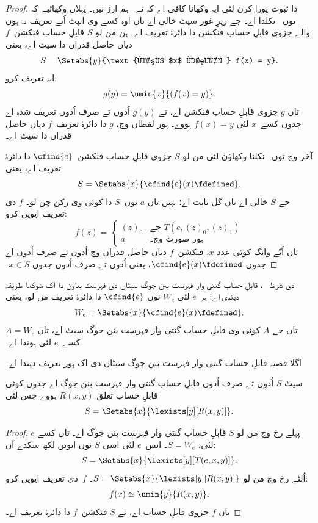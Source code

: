\documentclass[../../../include/open-logic-section]{subfiles}
\begin{document}
\begin{proof}
 دا ثبوت پورا کرن لئی
ایہ وکھانا کافی اے کہ  تے~
 ہم ارز نیں۔ پہلاں
وکھائیے کہ  توں~
 نکلدا اے۔ %
جے زیرِ غور سیٹ خالی اے تاں اوہ کسے وی انپٹ
اُتے تعریف نہ ہون والے جزوی قابلِ حساب فنکشن
دا دائرۂ تعریف اے۔ ہن من لو $S$
قابلِ حساب فنکشن~$f$ دیاں حاصل قدراں دا سیٹ
اے، یعنی
\[
S = \Setabs{y}{\text{کسے $x$ لئی، } f(x) = y}.
\]
ایہ تعریف کرو:
\[
g(y) = \umin{x}{(f(x) = y)}.
\]
تاں $g$ جزوی قابلِ حساب فنکشن اے، تے $g(y)$
اُدوں تے صرف اُدوں تعریف شدہ اے جدوں
کسے~$x$ لئی $f(x) = y$ ہووے۔ ہور
لفظاں وچ، $g$ دا دائرۂ تعریف~$f$
دیاں حاصل قدراں دا سیٹ اے۔

آخر وچ  توں~
 نکلنا وکھاؤن لئی من لو
$S$ جزوی قابلِ حساب فنکشن~$\cfind{e}$
دا دائرۂ تعریف اے، یعنی
\[
S = \Setabs{x}{\cfind{e}(x) \fdefined}.
\]
جے $S$ خالی اے تاں گل ثابت اے؛ نہیں تاں
$a$ نوں~$S$ دا کوئی وی رکن چن لو۔
$f$ دی تعریف ایویں کرو:
\[
f(z) = \begin{cases}
(z)_0 & \text{جے $T(e,(z)_0,(z)_1)$} \\
a & \text{ہور صورت وچ۔}
\end{cases}
\]
تاں اُتّے وانگ کوئی عدد $x$، فنکشن~$f$
دیاں حاصل قدراں وچ اُدوں تے صرف اُدوں
اے جدوں $\cfind{e}(x) \fdefined$، یعنی
اُدوں تے صرف اُدوں جدوں $x \in S$۔
\end{proof}

 دی شرط~
، قابلِ حساب گنتی وار
فہرست بنن جوگ سیٹاں دی فہرست بناؤن دا اک
سَوکھا طریقہ دیندی اے: ہر~$e$ لئی $W_e$
نوں $\cfind{e}$ دا دائرۂ تعریف من لو،
یعنی
\[
W_e = \Setabs{x}{\cfind{e}(x) \fdefined}.
\]
تاں جے $A$ کوئی وی قابلِ حساب گنتی وار
فہرست بنن جوگ سیٹ اے، تاں $A = W_e$
کسے~$e$ لئی ہوندا اے۔

اگلا قضیہ قابلِ حساب گنتی وار فہرست بنن
جوگ سیٹاں دی اک ہور تعریف دیندا اے۔

\begin{thm}
سیٹ $S$ اُدوں تے صرف اُدوں قابلِ حساب
گنتی وار فہرست بنن جوگ اے جدوں کوئی
قابلِ حساب تعلق $R(x,y)$ ہووے جس لئی
\[
S = \Setabs{ x }{ \lexists[y][R(x,y)] }.
\]
\end{thm}

\begin{proof}
پہلے رخ وچ من لو $S$ قابلِ حساب گنتی وار
فہرست بنن جوگ اے۔ تاں کسے $e$ لئی،
$S = W_e$۔ ایس~$e$ لئی اسی $S$
نوں ایویں لکھ سکدے آں:
\[
S = \Setabs{ x }{ \lexists[y][T(e, x, y)] }.
\]
اُلٹے رخ وچ من لو $S = \Setabs{ x }{
  \lexists[y][R(x, y)] }$۔ $f$~دی
تعریف ایویں کرو:
\[
f(x) \simeq \umin{y}{R(x, y)}.
\]
تاں $f$ جزوی قابلِ حساب اے، تے $S$
فنکشن~$f$ دا دائرۂ تعریف اے۔
\end{proof}
\end{document}
